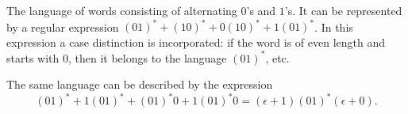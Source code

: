 \begin{exl}
The language of words consisting of alternating $0$'s and $1$'s.
It can be represented by a regular expression $(01)^* + (10)^* + 0(10)^* + 1(01)^*$.
In this expression a case distinction is incorporated: if the word is of even length and starts with $0$,
then it belongs to the language $(01)^*$, etc.

The same language can be described by the expression
\[
(01)^* + 1(01)^* + (01)^*0 + 1(01)^*0 = (\epsilon + 1)(01)^*(\epsilon + 0).
\]
\end{exl}